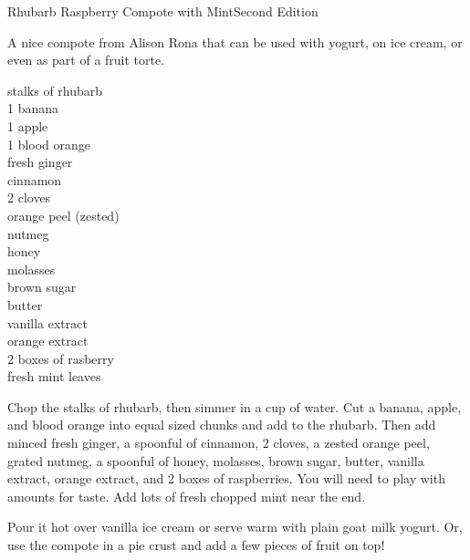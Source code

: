 \begin{entry}{Rhubarb Raspberry Compote with Mint}{Second Edition}

\begin{open}
  A nice compote from Alison Rona that can be used with yogurt, on ice cream,
  or even as part of a fruit torte.
\end{open}
\begin{ingredients}
    stalks of rhubarb\\
    1 banana\\
    1 apple\\
    1 blood orange\\
    fresh ginger\\
    cinnamon\\
    2 cloves\\
    orange peel (zested)\\
    nutmeg\\
    honey\\
    molasses\\
    brown sugar\\
    butter\\
    vanilla extract\\
    orange extract\\
    2 boxes of rasberry\\
    fresh mint leaves
\end{ingredients}
Chop the stalks of rhubarb, then simmer in a cup of water.  Cut a banana,
apple, and blood orange into equal sized chunks and add to the rhubarb.  Then
add minced fresh ginger, a spoonful of cinnamon, 2 cloves, a zested orange peel,
grated nutmeg, a spoonful of honey, molasses, brown sugar, butter, vanilla
extract, orange extract, and 2 boxes of raspberries.  You will need to play with
amounts for taste.  Add lots of fresh chopped mint near the end.

Pour it hot over vanilla ice cream or serve warm with plain goat milk yogurt.
Or, use the compote in a pie crust and add a few pieces of fruit on top!
\end{entry}

